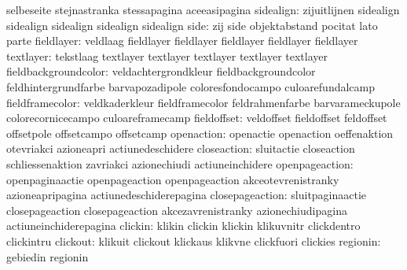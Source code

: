                            selbeseite                stejnastranka
                           stessapagina              aceeasipagina
   sidealign: zijuitlijnen sidealign
              sidealign    sidealign
              sidealign    sidealign
                     side: zij                       side
                           objektabstand             pocitat
                           lato                      parte
 fieldlayer: veldlaag                  fieldlayer
             fieldlayer                fieldlayer
             fieldlayer                fieldlayer
textlayer: tekstlaag                 textlayer
           textlayer                 textlayer
           textlayer                 textlayer
     fieldbackgroundcolor: veldachtergrondkleur      fieldbackgroundcolor
                           feldhintergrundfarbe      barvapozadipole
                           coloresfondocampo         culoarefundalcamp
          fieldframecolor: veldkaderkleur            fieldframecolor
                           feldrahmenfarbe           barvarameckupole
                           colorecornicecampo        culoareframecamp
              fieldoffset: veldoffset                fieldoffset
                           feldoffset                offsetpole
                           offsetcampo               offsetcamp
               openaction: openactie                 openaction
                           oeffenaktion              otevriakci
                           azioneapri                actiunedeschidere
              closeaction: sluitactie                closeaction
                           schliessenaktion          zavriakci
                           azionechiudi              actiuneinchidere
           openpageaction: openpaginaactie           openpageaction
                           openpageaction            akceotevrenistranky
                           azioneapripagina          actiunedeschiderepagina %
          closepageaction: sluitpaginaactie          closepageaction
                           closepageaction           akcezavrenistranky
                           azionechiudipagina        actiuneinchiderepagina %
                  clickin: klikin                    clickin
                           klickin                   klikuvnitr
                           clickdentro               clickintru
                 clickout: klikuit                   clickout
                           klickaus                  klikvne
                           clickfuori                clickies
                 regionin: gebiedin                  regionin
